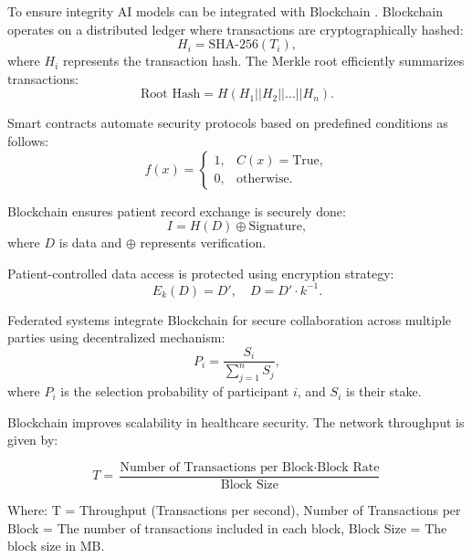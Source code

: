 \documentclass[pdflatex,sn-mathphys-num]{sn-jnl}%
\theoremstyle{thmstyleone}%
\theoremstyle{thmstyletwo}%
\theoremstyle{thmstylethree}%
\begin{document}
To ensure integrity AI models can be integrated with Blockchain \cite{bib6}. Blockchain operates on a distributed ledger where transactions are cryptographically hashed\cite{bib7}:
\begin{equation}
H_i = \text{SHA-256}(T_i), 
\end{equation}
where \(H_i\) represents the transaction hash. The Merkle root efficiently summarizes transactions\cite{bib7}:
\begin{equation}
\text{Root Hash} = H(H_1 || H_2 || \ldots || H_n).
\end{equation}

Smart contracts automate security protocols based on predefined conditions as follows:
\begin{equation}
f(x) = 
\begin{cases} 
1, & C(x) = \text{True}, \\
0, & \text{otherwise}.
\end{cases}
\end{equation}

Blockchain ensures patient record exchange is securely done:
\begin{equation}
I = H(D) \oplus \text{Signature},
\end{equation}
where \(D\) is data and \(\oplus\) represents verification.

Patient-controlled data access is protected using encryption strategy:
\begin{equation}
E_k(D) = D', \quad D = D' \cdot k^{-1}.
\end{equation}

Federated systems integrate Blockchain \cite{bib9}for secure collaboration across multiple parties using decentralized mechanism:
\begin{equation}
P_i = \frac{S_i}{\sum_{j=1}^n S_j},
\end{equation}
where \(P_i\) is the selection probability of participant \(i\), and \(S_i\) is their stake.

Blockchain improves scalability in healthcare security. The network throughput is given by\cite{bib8}:

\begin{equation}
  T = \frac{\text{Number of Transactions per Block} \cdot \text{Block Rate}}{\text{Block Size}}  
\end{equation}

\noindent Where:
 T = Throughput (Transactions per second), Number of Transactions per Block = The number of transactions included in each block, Block Size = The block size in MB.
\end{document}
